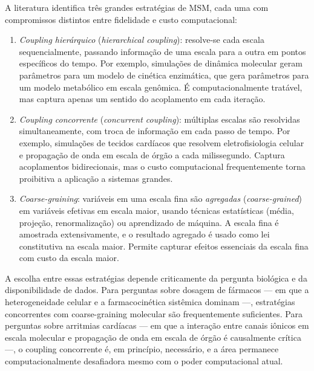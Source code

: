 A literatura identifica três grandes estratégias de MSM, cada uma com compromissos distintos entre fidelidade e custo computacional:

\begin{enumerate}
  \item \emph{Coupling hierárquico} (\emph{hierarchical coupling}): resolve-se cada escala sequencialmente, passando informação de uma escala para a outra em pontos específicos do tempo. Por exemplo, simulações de dinâmica molecular geram parâmetros para um modelo de cinética enzimática, que gera parâmetros para um modelo metabólico em escala genômica. É computacionalmente tratável, mas captura apenas um sentido do acoplamento em cada iteração.
  \item \emph{Coupling concorrente} (\emph{concurrent coupling}): múltiplas escalas são resolvidas simultaneamente, com troca de informação em cada passo de tempo. Por exemplo, simulações de tecidos cardíacos que resolvem eletrofisiologia celular e propagação de onda em escala de órgão a cada milissegundo. Captura acoplamentos bidirecionais, mas o custo computacional frequentemente torna proibitiva a aplicação a sistemas grandes.
  \item \emph{Coarse-graining}: variáveis em uma escala fina são \emph{agregadas} (\emph{coarse-grained}) em variáveis efetivas em escala maior, usando técnicas estatísticas (média, projeção, renormalização) ou aprendizado de máquina. A escala fina é amostrada extensivamente, e o resultado agregado é usado como lei constitutiva na escala maior. Permite capturar efeitos essenciais da escala fina com custo da escala maior.
\end{enumerate}

A escolha entre essas estratégias depende criticamente da pergunta biológica e da disponibilidade de dados. Para perguntas sobre dosagem de fármacos --- em que a heterogeneidade celular e a farmacocinética sistêmica dominam ---, estratégias concorrentes com coarse-graining molecular são frequentemente suficientes. Para perguntas sobre arritmias cardíacas --- em que a interação entre canais iônicos em escala molecular e propagação de onda em escala de órgão é causalmente crítica ---, o coupling concorrente é, em princípio, necessário, e a área permanece computacionalmente desafiadora mesmo com o poder computacional atual.



